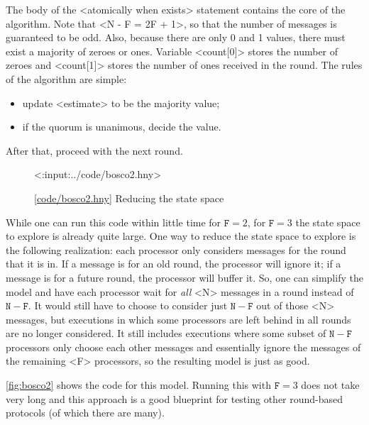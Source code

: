 \documentclass{report}
\newcommand{\harmonylink}[1]{%
[\href{https://harmony.cs.cornell.edu/#1}{\underline{#1}}]%
}
\newenvironment{code}{
\tcolorbox
}{
\endtcolorbox
}
\begin{document}
The body of the <{atomically when exists}> statement contains the core of the algorithm.
Note that <{N - F = 2F + 1}>, so that the number of
messages is guaranteed to be odd.  Also, because there are only 0 and 1 values, there
must exist a majority of zeroes or ones.  Variable <{count[0]}> stores the number
of zeroes and <{count[1]}> stores the number of ones received in the round.
The rules of the algorithm are simple:
\begin{itemize}
\item update <{estimate}> to be the majority value;
\item if the quorum is unanimous, decide the value.
\end{itemize}
After that, proceed with the next round.

\begin{figure}
\begin{code}
<{:input:../code/bosco2.hny}>
\end{code}
\caption{\harmonylink{code/bosco2.hny} Reducing the state space}
\label{fig:bosco2}
\end{figure}

While one can run this code within little time for $\mathtt{F} = 2$, for
$\mathtt{F} = 3$ the state space to explore is already quite large.
One way to reduce the state space to explore is the following realization:
each processor only considers messages for the round that it is in.
If a message is for an old round, the processor will ignore it;
if a message is for a future round, the processor will buffer it.
So, one can simplify the model and have each processor wait
for \emph{all} <{N}> messages in a round
instead of $\mathtt{N} - \mathtt{F}$.
It would still have to choose to consider just $\mathtt{N} - \mathtt{F}$
out of those <{N}> messages, but executions in which some processors
are left behind in all rounds are no longer considered.
It still includes executions where some subset of $\mathtt{N} - \mathtt{F}$
processors only choose each other messages and essentially ignore the
messages of the remaining <{F}> processors, so the resulting model
is just as good.

\autoref{fig:bosco2} shows the code for this model.  Running this with
$\mathtt{F} = 3$ does not take very long and this approach is a good
blueprint for testing other round-based protocols (of which there are
many).
\end{document}
